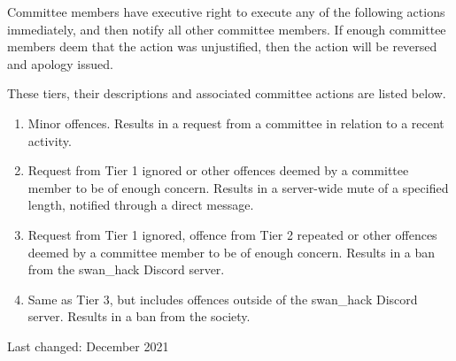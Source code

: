 \documentclass[12pt]{extarticle}
\begin{document}
	Committee members have executive right to execute any of the following actions immediately, and then notify all other committee members. If enough committee members deem that the action was unjustified, then the action will be reversed and apology issued. 
	
	These tiers, their descriptions and associated committee actions are listed below.
	\begin{enumerate}
	    \item Minor offences. Results in a request from a committee in relation to a recent activity.
	    \item Request from Tier 1 ignored or other offences deemed by a committee member to be of enough concern. Results in a server-wide mute of a specified length, notified through a direct message.
	    \item Request from Tier 1 ignored, offence from Tier 2 repeated or other offences deemed by a committee member to be of enough concern. Results in a ban from the swan\_hack Discord server.
	    \item Same as Tier 3, but includes offences outside of the swan\_hack Discord server. Results in a ban from the society. 
	\end{enumerate}
	    
	\footnotesize Last changed: December 2021 
\end{document}
